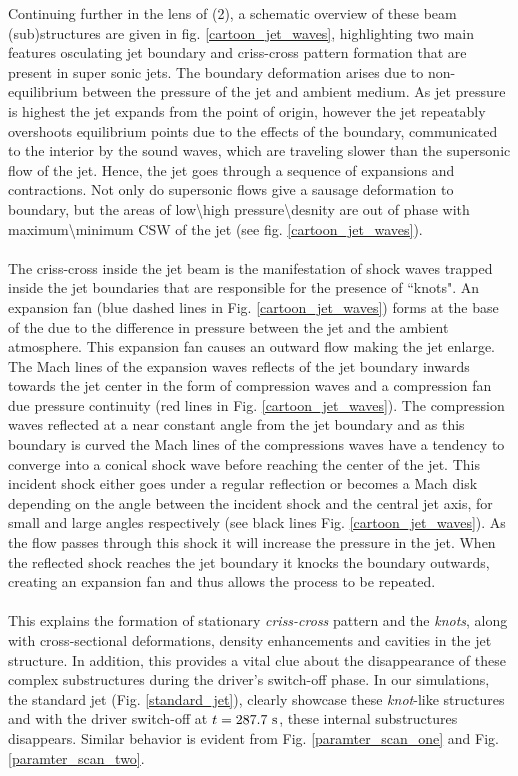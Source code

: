 \documentclass[12pt]{ociamthesis}
\newcommand{\fref}[1]{Fig. \eqref{#1}}
\newcommand{\np}{\\ \\}
\begin{document}
Continuing further in the lens of (2), a schematic overview of these beam (sub)structures are given in fig. \ref{cartoon_jet_waves}, highlighting two main features osculating jet boundary and criss-cross pattern formation that are present in super sonic jets. The boundary deformation arises due to non-equilibrium between the pressure of the jet and ambient medium. As jet pressure is highest the jet expands from the point of origin, however the jet repeatably overshoots equilibrium points due to the effects of the boundary, communicated to the interior by the sound waves, which are traveling slower than the supersonic flow of the jet. Hence, the jet goes through a sequence of expansions and contractions. Not only do supersonic flows give a sausage deformation to boundary, but the areas of low\textbackslash high pressure\textbackslash desnity are out of phase with maximum\textbackslash minimum CSW of the jet (see fig. \ref{cartoon_jet_waves}). \np  
%
The criss-cross inside the jet beam is the manifestation of shock waves trapped inside the jet boundaries that are responsible for the presence of ``knots". An expansion fan (blue dashed lines in Fig. \eqref{cartoon_jet_waves}) forms at the base of the due to the difference in pressure between the jet and the ambient atmosphere. This expansion fan causes an outward flow making the jet enlarge. The Mach lines of the expansion waves reflects of the jet boundary inwards towards the jet center in the form of compression waves and a compression fan due pressure continuity (red lines in Fig. \eqref{cartoon_jet_waves}). The compression waves reflected at a near constant angle from the jet boundary and as this boundary is curved the Mach lines of the compressions waves have a tendency to converge into a conical shock wave before reaching the center of the jet. This incident shock either goes under a regular reflection or becomes a Mach disk depending on the angle between the incident shock and the central jet axis, for small and large angles respectively (see black lines Fig. \eqref{cartoon_jet_waves}). As the flow passes through this shock it will increase the pressure in the jet. When the reflected shock reaches the jet boundary it knocks the boundary outwards, creating an expansion fan and thus allows the process to be repeated. \np
%
This explains the formation of stationary \textit{criss-cross} pattern and the \textit{knots}, along with cross-sectional deformations, density enhancements and cavities in the jet structure. In addition, this provides a vital clue about the disappearance of these complex substructures during the driver’s switch-off phase. In our simulations, the standard jet (\fref{standard_jet}), clearly showcase these \textit{knot}-like structures and with the driver switch-off at $t=287.7~\rm{s}$, these internal substructures disappears. Similar behavior is evident from \fref{paramter_scan_one} and \fref{paramter_scan_two}.  
\end{document}
